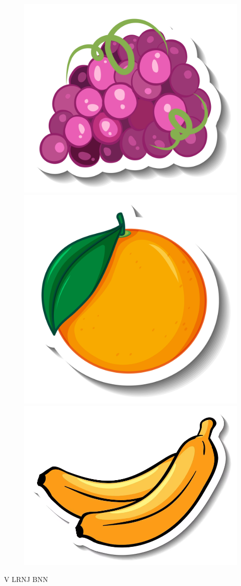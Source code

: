 \begin{figure}[H]
\centering
\includegraphics[width=.3\textwidth]{media/image69.jpg}
\includegraphics[width=.3\textwidth]{media/image70.jpg}
\includegraphics[width=.3\textwidth]{media/image72.png}
\end{figure}

\begin{center}
V \hspace{1,5cm} LRNJ \hspace{0,5cm} 
\hspace{1,0cm} BNN
\end{center}

